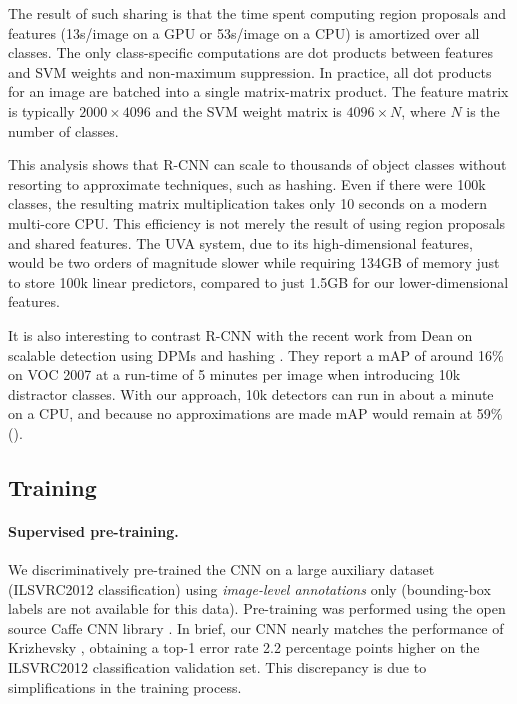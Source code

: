 The result of such sharing is that the time spent computing region
proposals and features (13s/image on a GPU or
53s/image on a CPU) is amortized over all classes. The only
class-specific computations are dot products between features and
SVM weights and non-maximum suppression. 
In practice, all dot products for an image are batched
into a single matrix-matrix product. The feature matrix is typically
$2000 \times 4096$ and the SVM weight matrix is $4096 \times
N$, where $N$ is the number of classes. 

This analysis shows that R-CNN can
scale to thousands of object classes without resorting to approximate
techniques, such as hashing. 
Even if there were 100k classes, the resulting
matrix multiplication takes only 10 seconds on a modern multi-core CPU.
This efficiency is not merely the result
of using region proposals and shared features. The UVA system, 
due to its high-dimensional features, would be two orders
of magnitude slower while requiring
134GB of memory just to store 100k linear predictors, compared
to just 1.5GB for our lower-dimensional features.

It is also interesting to contrast R-CNN with the recent work from Dean \etal
on scalable detection using DPMs and hashing \cite{dean2013fast}. They report a mAP of around 16\% on VOC 2007 at a run-time of 5 minutes per image
when introducing 10k distractor classes. With our approach, 10k
detectors can run in about a minute on a CPU, and because 
no approximations are made mAP would remain at 59\% ().


\subsection{Training}

\paragraph{Supervised pre-training.}
We discriminatively pre-trained the CNN on a large auxiliary dataset (ILSVRC2012 classification) using \emph{image-level annotations} only (bounding-box labels are not available for this data).
Pre-training was performed using the open source Caffe CNN library \cite{Jia13caffe}.
In brief, our CNN nearly matches the performance of Krizhevsky \etal
\cite{krizhevsky2012imagenet}, obtaining a top-1 error rate
2.2 percentage points higher on the ILSVRC2012 classification validation
set. This discrepancy is due to simplifications in the training process.

